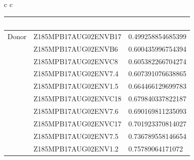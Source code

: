 \documentclass[conference]{IEEEtran}
\begin{document}
\begin{table}[]
\begin{tabular}{ c c}
\begin{tabular}{l l l}
	& \ &\ \\
	\hline
Donor &	Z185MPB17AUG02ENVB17	&	0.499258854685399	\\
&	Z185MPB17AUG02ENVB6	&	0.600435996754394	\\
&	Z185MPB17AUG02ENVC8	&	0.605382266704274	\\
&	Z185MPB17AUG02ENV7.4	&	0.607391076638865	\\
&	Z185MPB17AUG02ENV1.5	&	0.664466129699783	\\
&	Z185MPB17AUG02ENVC18	&	0.679840337822187	\\
&	Z185MPB17AUG02ENV7.6	&	0.690169811235093	\\
&	Z185MPB17AUG02ENVC17	&	0.701923370814027	\\
&	Z185MPB17AUG02ENV7.5	&	0.736789558146654	\\
&	Z185MPB17AUG02ENV1.2	&	0.75789064171072	\\
\end{tabular}\\
\end{tabular}
\end{table}
\end{document}
